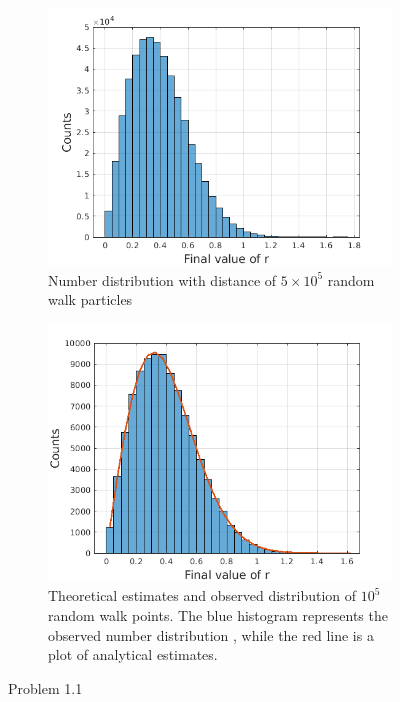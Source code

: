 \documentclass[a4paper]{article}
\begin{document}
\begin{figure} [h]
			\begin{subfigure} {.475\columnwidth}
				\includegraphics[width=\columnwidth]{../plots/1ac_hist_randomwalk.png}
				\caption{Number distribution with distance of \(5 \times 10^5\) random walk particles}
				\label{fig:1c}
			\end{subfigure}%
			\hfill
			\begin{subfigure} {.475\columnwidth}
				\includegraphics[width=\columnwidth]{../plots/1ad_hist_randomwalk.png}
				\caption{Theoretical estimates and observed distribution of \(10^5\) random walk points. The blue histogram represents the observed number distribution , while the red line is a plot of analytical estimates.}
				\label{fig:1d}
			\end{subfigure}
			\caption{Problem 1.1}
			\label{fig:1}
		\end{figure}
		
\end{document}
